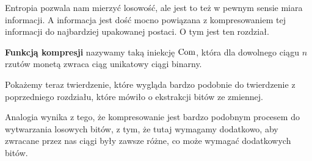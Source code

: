 Entropia pozwala nam mierzyć losowość, ale jest to też w pewnym sensie miara informacji.
A informacja jest dość mocno powiązana z kompresowaniem tej informacji do najbardziej upakowanej postaci.
O tym jest ten rozdział.

\begin{definition}
    \textbf{Funkcją kompresji} nazywamy taką iniekcję \( \operatorname{Com} \), która dla dowolnego ciągu \( n \) rzutów monetą zwraca ciąg unikatowy ciągi binarny.
\end{definition}

Pokażemy teraz twierdzenie, które wygląda bardzo podobnie do twierdzenie z poprzedniego rozdziału, które mówiło o ekstrakcji bitów ze zmiennej. 

Analogia wynika z tego, że kompresowanie jest bardzo podobnym procesem do wytwarzania losowych bitów, 
z tym, że tutaj wymagamy dodatkowo, aby zwracane przez nas ciągi były zawsze różne, co może wymagać dodatkowych bitów.

